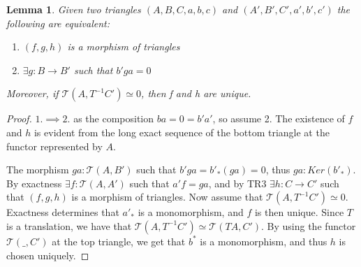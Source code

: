 \documentclass[11pt]{article}
\newtheorem{lemma}[theorem]{Lemma}
\theoremstyle{definition}
\theoremstyle{remark}
\begin{document}
            \begin{lemma}
                Given two triangles $(A,B,C,a,b,c)$ and $(A',B',C',a',b',c')$ the following are equivalent:
                \begin{center}
                    \begin{minipage}[c]{0.4\textwidth}
                    \end{minipage}
                    \begin{minipage}[c]{0.5\textwidth}
                        \begin{enumerate}
                            \item $(f,g,h)$ is a morphism of triangles
                            \item $\exists g:B\rightarrow B'$ such that $b'ga = 0$
                        \end{enumerate}
                    \end{minipage}
                \end{center}
                Moreover, if $\mathcal{T}(A,T^{-1}C')\simeq 0$, then f and h are unique.
            \end{lemma}

            \begin{proof}
                $1. \implies 2.$ as the composition $ba = 0 = b'a'$, so assume 2. The existence of $f$ and $h$ is evident from the long exact sequence of the bottom triangle at the functor represented by $A$. 
                \begin{center}
                \end{center}
                The morphism $ga:\mathcal{T}(A,B')$ such that $b'ga=b'_*(ga)=0$, thus $ga:Ker(b'_*)$. By exactness $\exists f:\mathcal{T}(A,A')$ such that $a'f = ga$, and by TR3 $\exists h: C \rightarrow C'$ such that $(f,g,h)$ is a morphism of triangles.
                Now assume that $\mathcal{T}(A,T^{-1}C')\simeq 0$. Exactness determines that $a'_*$ is a monomorphism, and $f$ is then unique. Since $T$ is a translation, we have that $\mathcal{T}(A,T^{-1}C')\simeq\mathcal{T}(TA,C')$. By using the functor $\mathcal{T}(\_,C')$ at the top triangle, we get that $b^*$ is a monomorphism, and thus $h$ is chosen uniquely.
            \end{proof}
\end{document}
